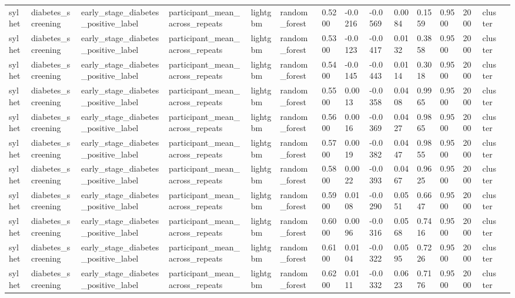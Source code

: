 \begin{tabular}{lllllllllllllll}
sylhet & diabetes\_screening & early\_stage\_diabetes\_positive\_label & participant\_mean\_across\_repeats & lightgbm & random\_forest & 0.5200 & -0.0216 & -0.0569 & 0.0084 & 0.1559 & 0.9500 & 2000 & cluster &  \\
sylhet & diabetes\_screening & early\_stage\_diabetes\_positive\_label & participant\_mean\_across\_repeats & lightgbm & random\_forest & 0.5300 & -0.0123 & -0.0417 & 0.0132 & 0.3858 & 0.9500 & 2000 & cluster &  \\
sylhet & diabetes\_screening & early\_stage\_diabetes\_positive\_label & participant\_mean\_across\_repeats & lightgbm & random\_forest & 0.5400 & -0.0145 & -0.0443 & 0.0114 & 0.3018 & 0.9500 & 2000 & cluster &  \\
sylhet & diabetes\_screening & early\_stage\_diabetes\_positive\_label & participant\_mean\_across\_repeats & lightgbm & random\_forest & 0.5500 & 0.0013 & -0.0358 & 0.0408 & 0.9965 & 0.9500 & 2000 & cluster &  \\
sylhet & diabetes\_screening & early\_stage\_diabetes\_positive\_label & participant\_mean\_across\_repeats & lightgbm & random\_forest & 0.5600 & 0.0016 & -0.0369 & 0.0427 & 0.9865 & 0.9500 & 2000 & cluster &  \\
sylhet & diabetes\_screening & early\_stage\_diabetes\_positive\_label & participant\_mean\_across\_repeats & lightgbm & random\_forest & 0.5700 & 0.0019 & -0.0382 & 0.0447 & 0.9855 & 0.9500 & 2000 & cluster &  \\
sylhet & diabetes\_screening & early\_stage\_diabetes\_positive\_label & participant\_mean\_across\_repeats & lightgbm & random\_forest & 0.5800 & 0.0022 & -0.0393 & 0.0467 & 0.9625 & 0.9500 & 2000 & cluster &  \\
sylhet & diabetes\_screening & early\_stage\_diabetes\_positive\_label & participant\_mean\_across\_repeats & lightgbm & random\_forest & 0.5900 & 0.0108 & -0.0290 & 0.0551 & 0.6647 & 0.9500 & 2000 & cluster &  \\
sylhet & diabetes\_screening & early\_stage\_diabetes\_positive\_label & participant\_mean\_across\_repeats & lightgbm & random\_forest & 0.6000 & 0.0096 & -0.0316 & 0.0568 & 0.7416 & 0.9500 & 2000 & cluster &  \\
sylhet & diabetes\_screening & early\_stage\_diabetes\_positive\_label & participant\_mean\_across\_repeats & lightgbm & random\_forest & 0.6100 & 0.0104 & -0.0322 & 0.0595 & 0.7226 & 0.9500 & 2000 & cluster &  \\
sylhet & diabetes\_screening & early\_stage\_diabetes\_positive\_label & participant\_mean\_across\_repeats & lightgbm & random\_forest & 0.6200 & 0.0111 & -0.0332 & 0.0623 & 0.7176 & 0.9500 & 2000 & cluster &  \\

\end{tabular}
